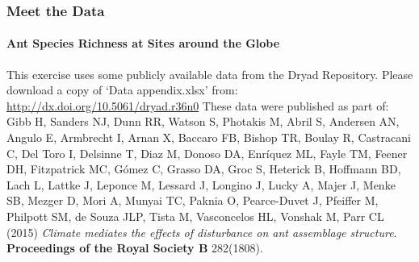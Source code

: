 \documentclass[xcolor=dvipsnames]{beamer}
\begin{document}
\begin{frame}
\frametitle{Meet the Data}
\framesubtitle{Ant Species Richness at Sites around the Globe}
This exercise uses some publicly available data from the Dryad Repository. Please download a copy of `Data appendix.xlsx' from:
\newline
\newline
\url{http://dx.doi.org/10.5061/dryad.r36n0}
\newline
\newline
These data were published as part of:
\newline
\newline
\small Gibb H, Sanders NJ, Dunn RR, Watson S, Photakis M, Abril S, Andersen AN, Angulo E, Armbrecht I, Arnan X, Baccaro FB, Bishop TR, Boulay R, Castracani C, Del Toro I, Delsinne T, Diaz M, Donoso DA, Enríquez ML, Fayle TM, Feener DH, Fitzpatrick MC, Gómez C, Grasso DA, Groc S, Heterick B, Hoffmann BD, Lach L, Lattke J, Leponce M, Lessard J, Longino J, Lucky A, Majer J, Menke SB, Mezger D, Mori A, Munyai TC, Paknia O, Pearce-Duvet J, Pfeiffer M, Philpott SM, de Souza JLP, Tista M, Vasconcelos HL, Vonshak M, Parr CL (2015) \textit{Climate mediates the effects of disturbance on ant assemblage structure}. \textbf{Proceedings of the Royal Society B} 282(1808).
\end{frame}
\end{document}
